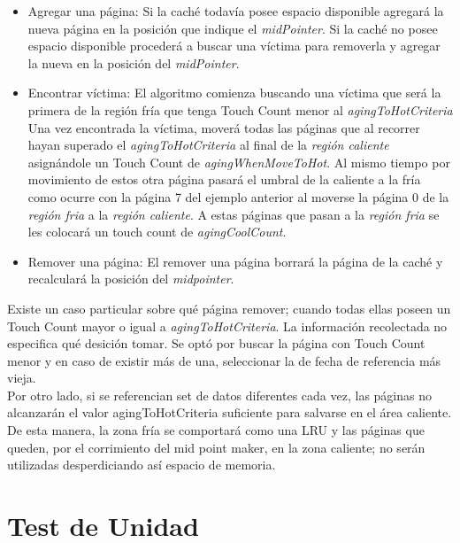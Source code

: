 \documentclass[11pt, a4paper, spanish]{article}
\begin{document}
\begin{itemize}
	\item{Agregar una p\'agina:
		Si la cach\'e todav\'ia posee espacio disponible agregar\'a la nueva p\'agina en la posici\'on que indique el \textit{midPointer}.
		Si la cach\'e no posee espacio disponible proceder\'a a buscar una v\'ictima para removerla y agregar la nueva en la posici\'on del \textit{midPointer}.
	}
	\item{Encontrar v\'ictima: }
		El algoritmo comienza buscando una v\'ictima que ser\'a la primera de la regi\'on fr\'ia que tenga Touch Count menor al \textit{agingToHotCriteria}
		Una vez encontrada la v\'ictima, mover\'a todas las p\'aginas que al recorrer hayan superado el  \textit{agingToHotCriteria} al
		final de la \textit{regi\'on caliente} asign\'andole un Touch Count de \textit{agingWhenMoveToHot}. Al mismo tiempo por movimiento de estos otra p\'agina pasar\'a
		el umbral de la caliente a la fr\'ia como ocurre con la p\'agina 7 del ejemplo anterior al moverse la p\'agina 0 de la \textit{regi\'on fria}
		a la \textit{regi\'on caliente}. A estas p\'aginas que pasan a la \textit{regi\'on fria} se les colocar\'a un touch count de \textit{agingCoolCount}.
		
	\item{Remover una p\'agina: }
		El remover una p\'agina borrar\'a la p\'agina de la cach\'e y recalcular\'a la posici\'on del \textit{midpointer}.
\end{itemize}

Existe un caso particular sobre qu\'e p\'agina remover; cuando todas ellas poseen un Touch Count mayor o igual a \textit{agingToHotCriteria}. La informaci\'on recolectada no especifica qu\'e desici\'on tomar. Se opt\'o por buscar la p\'agina con Touch Count menor y en caso de existir m\'as de una, seleccionar la de fecha de referencia m\'as vieja.\\

Por otro lado, si se referencian set de datos diferentes cada vez, las p\'aginas no alcanzar\'an el valor agingToHotCriteria suficiente para salvarse en el \'area caliente. De esta manera, la zona fr\'ia se comportar\'a como una LRU y las p\'aginas que queden, por el corrimiento del mid point maker, en la zona caliente; no ser\'an utilizadas desperdiciando as\'i espacio de memoria.\\

\newpage
\section{Test de Unidad}
\end{document}
